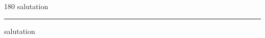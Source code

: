 
\begin{frame}
\begin{center}
\begin{turn}{180}
{\fontsize{2.5cm}{1em}\selectfont salutation}
\end{turn}
\vspace{1em}\par  
\hrule
\vspace{1em}\par  
{\fontsize{2.5cm}{1em}\selectfont salutation}
\end{center}
\end{frame}
